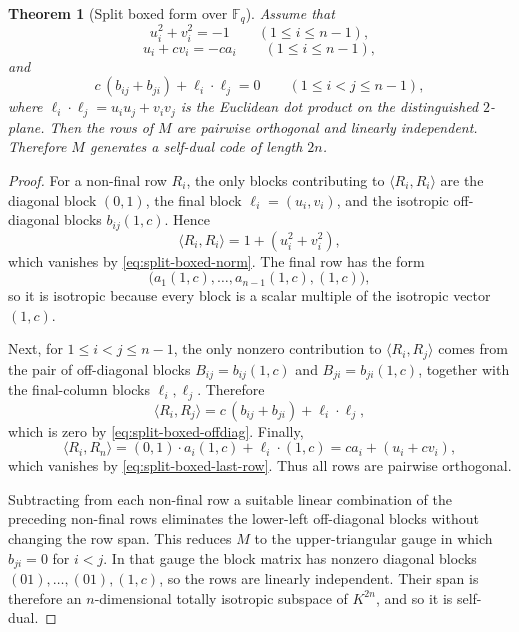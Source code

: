 \documentclass[12pt]{article}
\newtheorem{theorem}{Theorem}[section]
\newcommand{\F}{\mathbb{F}}
\begin{document}
\begin{theorem}[Split boxed form over \texorpdfstring{$\F_q$}{Fq}]
Assume that
\begin{equation}
\label{eq:split-boxed-norm}
u_i^2+v_i^2=-1
\qquad (1\le i\le n-1),
\end{equation}
\begin{equation}
\label{eq:split-boxed-last-row}
u_i+c v_i=-c a_i
\qquad (1\le i\le n-1),
\end{equation}
and
\begin{equation}
\label{eq:split-boxed-offdiag}
c\,(b_{ij}+b_{ji})+\ell_i\cdot \ell_j=0
\qquad (1\le i<j\le n-1),
\end{equation}
where \(\ell_i\cdot \ell_j=u_i u_j+v_i v_j\) is the Euclidean dot product on the distinguished \(2\)-plane. Then the rows of \(M\) are pairwise orthogonal and linearly independent. Therefore \(M\) generates a self-dual code of length \(2n\).
\end{theorem}

\begin{proof}
For a non-final row \(R_i\), the only blocks contributing to \(\langle R_i,R_i\rangle\) are the diagonal block \((0,1)\), the final block \(\ell_i=(u_i,v_i)\), and the isotropic off-diagonal blocks \(b_{ij}(1,c)\). Hence
\[
\langle R_i,R_i\rangle
=
1+(u_i^2+v_i^2),
\]
which vanishes by \eqref{eq:split-boxed-norm}. The final row has the form
\[
\bigl(a_1(1,c),\dots,a_{n-1}(1,c),(1,c)\bigr),
\]
so it is isotropic because every block is a scalar multiple of the isotropic vector \((1,c)\).

Next, for \(1\le i<j\le n-1\), the only nonzero contribution to \(\langle R_i,R_j\rangle\) comes from the pair of off-diagonal blocks \(B_{ij}=b_{ij}(1,c)\) and \(B_{ji}=b_{ji}(1,c)\), together with the final-column blocks \(\ell_i,\ell_j\). Therefore
\[
\langle R_i,R_j\rangle
=
c\,(b_{ij}+b_{ji})+\ell_i\cdot \ell_j,
\]
which is zero by \eqref{eq:split-boxed-offdiag}. Finally,
\[
\langle R_i,R_n\rangle
=
(0,1)\cdot a_i(1,c)+\ell_i\cdot (1,c)
=
c a_i + (u_i+c v_i),
\]
which vanishes by \eqref{eq:split-boxed-last-row}. Thus all rows are pairwise orthogonal.

Subtracting from each non-final row a suitable linear combination of the preceding non-final rows eliminates the lower-left off-diagonal blocks without changing the row span. This reduces \(M\) to the upper-triangular gauge in which \(b_{ji}=0\) for \(i<j\). In that gauge the block matrix has nonzero diagonal blocks \((01),\dots,(01),(1,c)\), so the rows are linearly independent. Their span is therefore an \(n\)-dimensional totally isotropic subspace of \(K^{2n}\), and so it is self-dual.
\end{proof}
\end{document}
